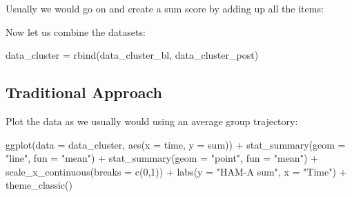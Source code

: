 \documentclass[
]{book}
\newenvironment{Shaded}{\begin{snugshade}}{\end{snugshade}}
\newcommand{\AttributeTok}[1]{\textcolor[rgb]{0.77,0.63,0.00}{#1}}
\newcommand{\DecValTok}[1]{\textcolor[rgb]{0.00,0.00,0.81}{#1}}
\newcommand{\FunctionTok}[1]{\textcolor[rgb]{0.00,0.00,0.00}{#1}}
\newcommand{\NormalTok}[1]{#1}
\newcommand{\OtherTok}[1]{\textcolor[rgb]{0.56,0.35,0.01}{#1}}
\newcommand{\SpecialCharTok}[1]{\textcolor[rgb]{0.00,0.00,0.00}{#1}}
\newcommand{\StringTok}[1]{\textcolor[rgb]{0.31,0.60,0.02}{#1}}
\begin{document}
Usually we would go on and create a sum score by adding up all the items:

\begin{Shaded}
\end{Shaded}

Now let us combine the datasets:

\begin{Shaded}
\begin{Highlighting}[]
\NormalTok{data\_cluster }\OtherTok{=} \FunctionTok{rbind}\NormalTok{(data\_cluster\_bl, data\_cluster\_post)}
\end{Highlighting}
\end{Shaded}

\hypertarget{traditional-approach}{%
\subsection{Traditional Approach}\label{traditional-approach}}

Plot the data as we usually would using an average group trajectory:

\begin{Shaded}
\begin{Highlighting}[]
\FunctionTok{ggplot}\NormalTok{(}\AttributeTok{data =}\NormalTok{ data\_cluster, }\FunctionTok{aes}\NormalTok{(}\AttributeTok{x =}\NormalTok{ time, }\AttributeTok{y =}\NormalTok{ sum)) }\SpecialCharTok{+}
  \FunctionTok{stat\_summary}\NormalTok{(}\AttributeTok{geom =} \StringTok{"line"}\NormalTok{, }\AttributeTok{fun =} \StringTok{"mean"}\NormalTok{) }\SpecialCharTok{+}
   \FunctionTok{stat\_summary}\NormalTok{(}\AttributeTok{geom =} \StringTok{"point"}\NormalTok{, }\AttributeTok{fun =} \StringTok{"mean"}\NormalTok{) }\SpecialCharTok{+}
  \FunctionTok{scale\_x\_continuous}\NormalTok{(}\AttributeTok{breaks =} \FunctionTok{c}\NormalTok{(}\DecValTok{0}\NormalTok{,}\DecValTok{1}\NormalTok{)) }\SpecialCharTok{+}
  \FunctionTok{labs}\NormalTok{(}\AttributeTok{y =} \StringTok{"HAM{-}A sum"}\NormalTok{, }\AttributeTok{x =} \StringTok{"Time"}\NormalTok{) }\SpecialCharTok{+}
  \FunctionTok{theme\_classic}\NormalTok{()}
\end{Highlighting}
\end{Shaded}
\end{document}
